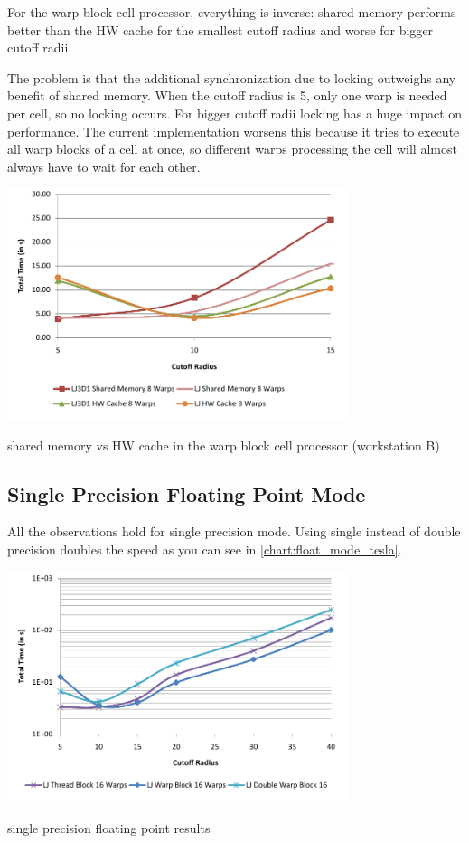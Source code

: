 For the warp block cell processor, everything is inverse: shared memory performs better than the HW cache for the smallest cutoff radius and worse for bigger cutoff radii.

The problem is that the additional synchronization due to locking outweighs any benefit of shared memory. When the cutoff radius is 5, only one warp is needed per cell, so no locking occurs. For bigger cutoff radii locking has a huge impact on performance. The current implementation worsens this because it tries to execute all warp blocks of a cell at once, so different warps processing the cell will almost always have to wait for each other.

\begin{chart}
\centering
\includegraphics[width=0.75\textwidth]{plots/wbcp_mode_comp_tesla.pdf}
\caption{shared memory vs HW cache in the warp block cell processor (workstation B)}
\label{chart:wbcp_mode_comp_tesla}
\end{chart}

\subsection{Single Precision Floating Point Mode}
All the observations hold for single precision mode. Using single instead of double precision doubles the speed as you can see in \autoref{chart:float_mode_tesla}.

\begin{chart}[tbh]
\centering
\includegraphics[width=0.75\textwidth]{plots/float_mode_tesla.pdf}
\caption{single precision floating point results}
\label{chart:float_mode_tesla}
\end{chart}

